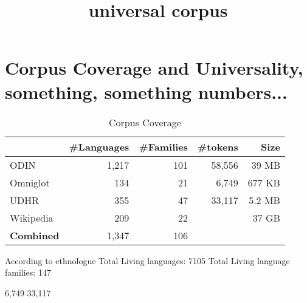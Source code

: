 \documentclass[11pt]{article}
\title{\textbf{universal corpus}}
\date{}
\begin{document}
\maketitle

\section{Corpus Coverage and Universality, something, something numbers...}

\begin{table}[h!]
\centering
    \begin{tabular}{l|rrrr}
    ~         				& \#Languages & \#Families 	&\#tokens		& Size	\\ \hline
    ODIN      				& 1,217      & 101       		& 58,556		& 39 MB		\\
    Omniglot  				& 134        & 21        		&	6,749			& 677 KB	\\
    UDHR      				& 355        & 47        		&	33,117		& 5.2 MB	\\
    Wikipedia 				& 209        & 22       		&						& 37 GB		\\ \hline
    \textbf{Combined}	& 1,347			 & 106 
    \end{tabular}
\caption{Corpus Coverage}
\end{table}


According to ethnologue
Total Living languages: 7105
Total Living language families: 147


6,749
33,117
\end{document}
